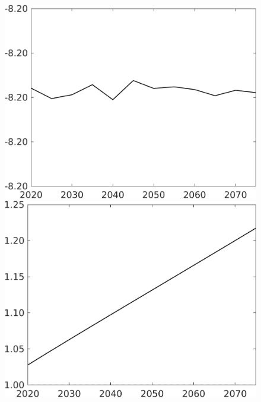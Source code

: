 \documentclass[12pt]{article}
\begin{document}
\begin{figure}[h!!]
\begin{minipage}[]{0.32\textwidth}
	\end{minipage}	
	\begin{minipage}[]{0.32\textwidth}
		\includegraphics[width=1\textwidth]{../../codding_model/own_basedOnFried/optimalPol_010922_revision/figures/all_13Sept22/CompTaul_Equlab_LFBAUPer_Reg0_G_spillover0_nsk1_xgr0_knspil0_sep1_countec0_GovRev0_etaa0.79.png}
	\end{minipage}	
	\begin{minipage}[]{0.32\textwidth}
		\includegraphics[width=1\textwidth]{../../codding_model/own_basedOnFried/optimalPol_010922_revision/figures/all_13Sept22/CompTaul_Equlab_LFBAU_Reg0_lambdaa_spillover0_nsk1_xgr0_knspil0_sep1_countec0_GovRev0_etaa0.79_lgd0.png}

\end{minipage}
\end{figure}
\end{document}

